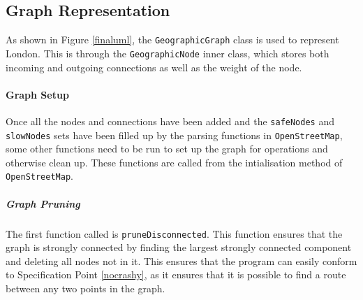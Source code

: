\documentclass[11pt,twoside,a4paper]{article}
\begin{document}
\subsection{Graph Representation}
As shown in Figure \ref{finaluml}, the \texttt{GeographicGraph} class is used to represent London. This is through the \texttt{GeographicNode} inner class, which stores both incoming and outgoing connections as well as the weight of the node. 
\paragraph{Graph Setup}
Once all the nodes and connections have been added and the \texttt{safeNodes} and \texttt{slowNodes} sets have been filled up by the parsing functions in \texttt{OpenStreetMap}, some other functions need to be run to set up the graph for operations and otherwise clean up.
These functions are called from the intialisation method of \texttt{OpenStreetMap}. 
\subparagraph{Graph Pruning}
The first function called is \texttt{pruneDisconnected}. This function ensures that the graph is strongly connected by finding the largest strongly connected component and deleting all nodes not in it. This ensures that the program can easily 
conform to Specification Point \ref{nocrashy}, as it ensures that it is possible to find a route between any two points in the graph. 
\end{document}

